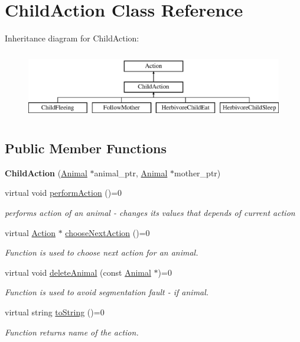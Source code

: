 \hypertarget{class_child_action}{}\section{Child\+Action Class Reference}
\label{class_child_action}
Inheritance diagram for Child\+Action\+:\begin{figure}[H]
\begin{center}
\leavevmode
\includegraphics[height=3.000000cm]{class_child_action}
\end{center}
\end{figure}
\subsection*{Public Member Functions}
\begin{DoxyCompactItemize}
\item 
\hypertarget{class_child_action_a13b43858371a74d598060840ebe2ba36}{}{\bfseries Child\+Action} (\hyperlink{class_animal}{Animal} $\ast$animal\+\_\+ptr, \hyperlink{class_animal}{Animal} $\ast$mother\+\_\+ptr)\label{class_child_action_a13b43858371a74d598060840ebe2ba36}

\item 
virtual void \hyperlink{class_child_action_a8b92e893b56c1741816149162c16d5be}{perform\+Action} ()=0
\begin{DoxyCompactList}\small\item\em performs action of an animal -\/ changes it\textquotesingle{}s values that depends of current action \end{DoxyCompactList}\item 
virtual \hyperlink{class_action}{Action} $\ast$ \hyperlink{class_child_action_a07c04b7ca874308f2209050998f1643d}{choose\+Next\+Action} ()=0
\begin{DoxyCompactList}\small\item\em Function is used to choose next action for an animal. \end{DoxyCompactList}\item 
virtual void \hyperlink{class_child_action_a153a1578923e7e55687550e53fec21bc}{delete\+Animal} (const \hyperlink{class_animal}{Animal} $\ast$)=0
\begin{DoxyCompactList}\small\item\em Function is used to avoid segmentation fault -\/ if animal. \end{DoxyCompactList}\item 
virtual string \hyperlink{class_child_action_ab079f9b34939cb040e129c7966222bbd}{to\+String} ()=0
\begin{DoxyCompactList}\small\item\em Function returns name of the action. \end{DoxyCompactList}\end{DoxyCompactItemize}
